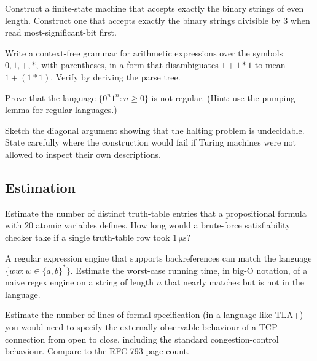 \begin{exercise}
Construct a finite-state machine that accepts exactly the binary strings of even length. Construct one that accepts exactly the binary strings divisible by $3$ when read most-significant-bit first.
\end{exercise}

\begin{exercise}
Write a context-free grammar for arithmetic expressions over the symbols $0, 1, +, *$, with parentheses, in a form that disambiguates $1 + 1 * 1$ to mean $1 + (1 * 1)$. Verify by deriving the parse tree.
\end{exercise}

\begin{exercise}
Prove that the language $\{0^n 1^n : n \geq 0\}$ is not regular. (Hint: use the pumping lemma for regular languages.)
\end{exercise}

\begin{exercise}
Sketch the diagonal argument showing that the halting problem is undecidable. State carefully where the construction would fail if Turing machines were not allowed to inspect their own descriptions.
\end{exercise}

\subsection*{Estimation}

\begin{exercise}
Estimate the number of distinct truth-table entries that a propositional formula with $20$ atomic variables defines. How long would a brute-force satisfiability checker take if a single truth-table row took $1\,\si{\micro\second}$?
\end{exercise}

\begin{exercise}
A regular expression engine that supports backreferences can match the language $\{w w : w \in \{a, b\}^*\}$. Estimate the worst-case running time, in big-O notation, of a naive regex engine on a string of length $n$ that nearly matches but is not in the language.
\end{exercise}

\begin{exercise}
Estimate the number of lines of formal specification (in a language like TLA+) you would need to specify the externally observable behaviour of a TCP connection from open to close, including the standard congestion-control behaviour. Compare to the RFC 793 page count.
\end{exercise}

